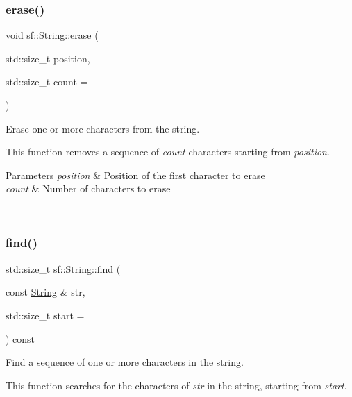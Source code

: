 \subsubsection{\texorpdfstring{erase()}{erase()}}
{\footnotesize\ttfamily void sf\+::\+String\+::erase (\begin{DoxyParamCaption}\item[{std\+::size\+\_\+t}]{position,  }\item[{std\+::size\+\_\+t}]{count = {} }\end{DoxyParamCaption})}



Erase one or more characters from the string. 

This function removes a sequence of {\itshape count} characters starting from {\itshape position}.


\begin{DoxyParams}{Parameters}
{\em position} & Position of the first character to erase \\
\hline
{\em count} & Number of characters to erase \begin{DoxyVerb}\end{DoxyVerb}
 \\
\hline
\end{DoxyParams}
\mbox{\label{classsf_1_1_string_aa189ec8656854106ab8d2e935fd9cbcc}} 
\subsubsection{\texorpdfstring{find()}{find()}}
{\footnotesize\ttfamily std\+::size\+\_\+t sf\+::\+String\+::find (\begin{DoxyParamCaption}\item[{const \mbox{\hyperlink{classsf_1_1_string}{String}} \&}]{str,  }\item[{std\+::size\+\_\+t}]{start = {} }\end{DoxyParamCaption}) const}



Find a sequence of one or more characters in the string. 

This function searches for the characters of {\itshape str} in the string, starting from {\itshape start}.


